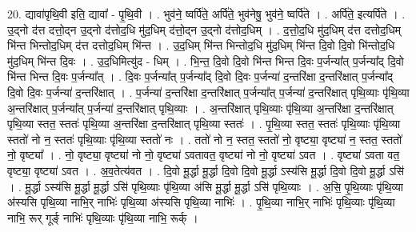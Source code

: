 \documentclass[17pt]{extarticle}
\begin{document}
20. द्यावा॑पृथि॒वी इति॒ द्यावा᳚ - पृ॒थि॒वी । . भुव॑ने॒ ष्वर्पि॑ते॒ अर्पि॑ते॒ भुव॑नेषु॒ भुव॑ने॒ ष्वर्पि॑ते । . अर्पि॑ते॒ इत्यर्पि॑ते । . उ॒द्नो द॑त्त दत्तो॒द्न उ॒द्नो द॑त्तोद॒धि मु॑द॒धिम् द॑त्तो॒द्न उ॒द्नो द॑त्तोद॒धिम् । . द॒त्तो॒द॒धि मु॑द॒धिम् द॑त्त दत्तोद॒धिम् भि॑न्त भिन्तोद॒धिम् द॑त्त दत्तोद॒धिम् भि॑न्त । . उ॒द॒धिम् भि॑न्त भिन्तोद॒धि मु॑द॒धिम् भि॑न्त दि॒वो दि॒वो भि॑न्तोद॒धि मु॑द॒धिम् भि॑न्त दि॒वः । . उ॒द॒धिमित्यु॑द - धिम् । . भि॒न्त॒ दि॒वो दि॒वो भि॑न्त भिन्त दि॒वः प॒र्जन्या᳚त् प॒र्जन्या᳚द् दि॒वो भि॑न्त भिन्त दि॒वः प॒र्जन्या᳚त् । . दि॒वः प॒र्जन्या᳚त् प॒र्जन्या᳚द् दि॒वो दि॒वः प॒र्जन्या॑ द॒न्तरि॑क्षा द॒न्तरि॑क्षात् प॒र्जन्या᳚द् दि॒वो दि॒वः प॒र्जन्या॑ द॒न्तरि॑क्षात् । . प॒र्जन्या॑ द॒न्तरि॑क्षा द॒न्तरि॑क्षात् प॒र्जन्या᳚त् प॒र्जन्या॑ द॒न्तरि॑क्षात् पृथि॒व्याः पृ॑थि॒व्या अ॒न्तरि॑क्षात् प॒र्जन्या᳚त् प॒र्जन्या॑ द॒न्तरि॑क्षात् पृथि॒व्याः । . अ॒न्तरि॑क्षात् पृथि॒व्याः पृ॑थि॒व्या अ॒न्तरि॑क्षा द॒न्तरि॑क्षात् पृथि॒व्या स्तत॒ स्ततः॑ पृथि॒व्या अ॒न्तरि॑क्षा द॒न्तरि॑क्षात् पृथि॒व्या स्ततः॑ । . पृ॒थि॒व्या स्तत॒ स्ततः॑ पृथि॒व्याः पृ॑थि॒व्या स्ततो॑ नो न॒ स्ततः॑ पृथि॒व्याः पृ॑थि॒व्या स्ततो॑ नः । . ततो॑ नो न॒ स्तत॒ स्ततो॑ नो॒ वृष्ट्या॒ वृष्ट्या॑ न॒ स्तत॒ स्ततो॑ नो॒ वृष्ट्या᳚ । . नो॒ वृष्ट्या॒ वृष्ट्या॑ नो नो॒ वृष्ट्या॑ ऽवतावत॒ वृष्ट्या॑ नो नो॒ वृष्ट्या॑ ऽवत । . वृष्ट्या॑ ऽवता वत॒ वृष्ट्या॒ वृष्ट्या॑ ऽवत । . अ॒व॒तेत्य॑वत । . दि॒वो मू॒र्द्धा मू॒र्द्धा दि॒वो दि॒वो मू॒र्द्धा ऽस्य॑सि मू॒र्द्धा दि॒वो दि॒वो मू॒र्द्धा ऽसि॑ । . मू॒र्द्धा ऽस्य॑सि मू॒र्द्धा मू॒र्द्धा ऽसि॑ पृथि॒व्याः पृ॑थि॒व्या अ॑सि मू॒र्द्धा मू॒र्द्धा ऽसि॑ पृथि॒व्याः । . अ॒सि॒ पृ॒थि॒व्याः पृ॑थि॒व्या अ॑स्यसि पृथि॒व्या नाभि॒र् नाभिः॑ पृथि॒व्या अ॑स्यसि पृथि॒व्या नाभिः॑ । . पृ॒थि॒व्या नाभि॒र् नाभिः॑ पृथि॒व्याः पृ॑थि॒व्या नाभि॒ रूर् गूर्ङ् नाभिः॑ पृथि॒व्याः पृ॑थि॒व्या नाभि॒ रूर्क् । \newline
\end{document}
